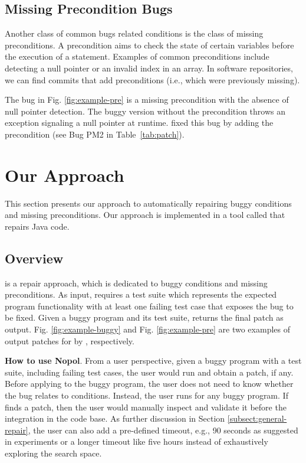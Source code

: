 \subsection{Missing Precondition Bugs}
Another class of common bugs related conditions is the class of missing preconditions. 
A precondition aims to check the state of certain variables before the execution of a statement.
Examples of common preconditions include detecting a null pointer or an invalid index in an array.  
In software repositories, we can find commits that add preconditions (i.e., which were previously missing).

The bug in Fig. \ref{fig:example-pre} is a missing precondition with the absence of null pointer detection. The buggy version without the precondition throws an exception signaling a null pointer at runtime. \nopol fixed this bug by adding the precondition (see Bug PM2 in Table~\ref{tab:patch}).

\section{Our Approach}
\label{sect:approach}
This section presents our approach to automatically repairing buggy \ourif conditions and missing preconditions.
Our approach is implemented in a tool called \nopol that repairs Java code.

\subsection{Overview}
\label{subsect:overview}

\nopol is a repair approach, which is dedicated to buggy \ourif conditions and missing preconditions. As input, \nopol requires a test suite which represents the expected program functionality with at least one failing test case that exposes the bug to be fixed. Given a buggy program and its test suite, \nopol returns the final patch as output. Fig. \ref{fig:example-buggy} and Fig. \ref{fig:example-pre} are two examples of output patches for \buggyandpres by \nopol, respectively. 

\textbf{How to use {\sc \textbf{Nopol}}}. From a user perspective, given a buggy program with a test suite, including failing test cases, the user would run \nopol and obtain a patch, if any. Before applying \nopol to the buggy program, the user does not need to know whether the bug relates to conditions. Instead, the user runs \nopol for any buggy program. 
If \nopol finds a patch, then the user would manually inspect and validate it before the integration in the code base. As further discussion in Section \ref{subsect:general-repair}, the user can also add a pre-defined timeout, e.g., 90 seconds as suggested in experiments or a longer timeout like five hours instead of exhaustively exploring the search space. 


